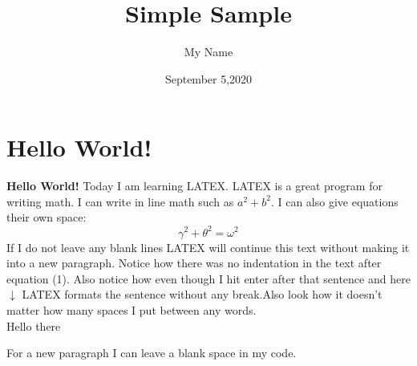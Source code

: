 \documentclass[10 pt]{article}
\begin{document}
\title{Simple Sample}
\author{My Name}
\date{September 5,2020}
\maketitle
\section{Hello World!}
\textbf{Hello World!}
Today I am learning {\Large L}A{\Large T}E{\Large X}. LATEX is a great program for writing math. I can write in line math such as $a^2+b^2$. I can also give equations their own space:
\begin{equation}
\gamma^2+\theta^2=\omega^2
\end{equation}
If I do not leave any blank lines LATEX will continue this text without making it into a new paragraph. Notice how there was no indentation in the text after equation (1). Also notice how even though I hit enter after that sentence and here $\downarrow$ LATEX formats the sentence without any break.Also look how it doesn't
matter how many spaces I put between any words. \\ 
Hello there

For a new paragraph I can leave a blank space in my code.
\end{document}
